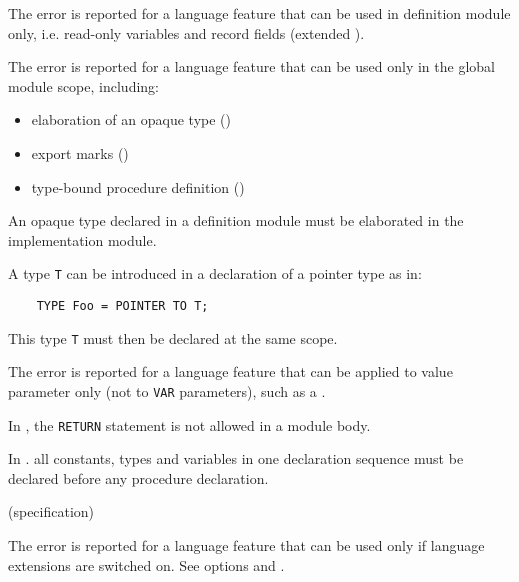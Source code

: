 The error is reported for a language feature that can be used in
definition module only, i.e. read-only variables and record fields
(extended \mt{}).


The error is reported for a language feature that can be used only
in the global module scope, including:

\begin{itemize}
\item elaboration of an opaque type (\mt{})
\item export marks (\ot{})
\item type-bound procedure definition (\ot{})
\end{itemize}


An opaque type declared in a definition module must be elaborated
in the implementation module.


A type \verb'T' can be introduced in a declaration of a pointer type as in:

\verb'    TYPE Foo = POINTER TO T;'

This type \verb'T' must then be declared at the same scope.


The error is reported for a language feature that can be applied
to value parameter only (not to \verb'VAR' parameters), such as
a .


In \ot{}, the \verb'RETURN' statement is not allowed in a module body. %


In \ot{}. all constants, types and variables in one declaration
sequence must be declared before any procedure declaration.

(specification)

The error is reported for a language feature that can be used only
if language extensions are switched on. See options  and
.


